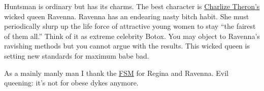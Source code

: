Huntsman is ordinary but has its charms. The best character is 
\href{http://en.wikipedia.org/wiki/Charlize_Theron}{Charlize Theron's} wicked queen Ravenna. 
Ravenna has an endearing nasty bitch
habit. She must periodically slurp up the life force of attractive young
women to stay ``the fairest of them all.'' Think of it as extreme
celebrity Botox. You may object to Ravenna's ravishing methods but you
cannot argue with the results. This wicked queen is setting new
standards for maximum babe bad.

As a mainly manly man I thank the \href{http://www.venganza.org/}{FSM}
for Regina and Ravenna. Evil queening: it's not for obese dykes anymore.





%